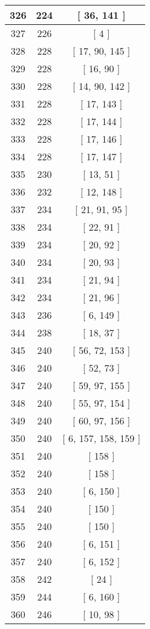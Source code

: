 \begin{center}
\begin{longtable}[H]{|| c c c ||}
\hline
326 & 224 & [ 36, 141 ] \\ 
\hline
327 & 226 & [ 4 ] \\ 
\hline
328 & 228 & [ 17, 90, 145 ] \\ 
\hline
329 & 228 & [ 16, 90 ] \\ 
\hline
330 & 228 & [ 14, 90, 142 ] \\ 
\hline
331 & 228 & [ 17, 143 ] \\ 
\hline
332 & 228 & [ 17, 144 ] \\ 
\hline
333 & 228 & [ 17, 146 ] \\ 
\hline
334 & 228 & [ 17, 147 ] \\ 
\hline
335 & 230 & [ 13, 51 ] \\ 
\hline
336 & 232 & [ 12, 148 ] \\ 
\hline
337 & 234 & [ 21, 91, 95 ] \\ 
\hline
338 & 234 & [ 22, 91 ] \\ 
\hline
339 & 234 & [ 20, 92 ] \\ 
\hline
340 & 234 & [ 20, 93 ] \\ 
\hline
341 & 234 & [ 21, 94 ] \\ 
\hline
342 & 234 & [ 21, 96 ] \\ 
\hline
343 & 236 & [ 6, 149 ] \\ 
\hline
344 & 238 & [ 18, 37 ] \\ 
\hline
345 & 240 & [ 56, 72, 153 ] \\ 
\hline
346 & 240 & [ 52, 73 ] \\ 
\hline
347 & 240 & [ 59, 97, 155 ] \\ 
\hline
348 & 240 & [ 55, 97, 154 ] \\ 
\hline
349 & 240 & [ 60, 97, 156 ] \\ 
\hline
350 & 240 & [ 6, 157, 158, 159 ] \\ 
\hline
351 & 240 & [ 158 ] \\ 
\hline
352 & 240 & [ 158 ] \\ 
\hline
353 & 240 & [ 6, 150 ] \\ 
\hline
354 & 240 & [ 150 ] \\ 
\hline
355 & 240 & [ 150 ] \\ 
\hline
356 & 240 & [ 6, 151 ] \\ 
\hline
357 & 240 & [ 6, 152 ] \\ 
\hline
358 & 242 & [ 24 ] \\ 
\hline
359 & 244 & [ 6, 160 ] \\ 
\hline
360 & 246 & [ 10, 98 ] \\ 

\end{longtable}
\end{center}
